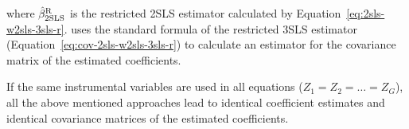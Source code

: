 where $\hat{\beta}^\text{R}_\text{2SLS}$ is the restricted 2SLS estimator calculated
by Equation~\ref{eq:2sls-w2sls-3sls-r}.
 uses the standard formula of the restricted 3SLS
estimator (Equation~\ref{eq:cov-2sls-w2sls-3sls-r}) to calculate an estimator
for the covariance matrix of the estimated coefficients.


If the same instrumental variables are used in all equations 
($Z_1 = Z_2 = \ldots = Z_G$),
all the above mentioned approaches lead to identical coefficient estimates
and identical covariance matrices of the estimated coefficients.

